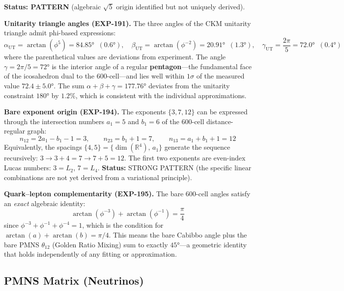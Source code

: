 \documentclass[12pt,a4paper]{article}
\begin{document}
\textbf{Status: PATTERN} (algebraic $\sqrt{5}$ origin identified but not uniquely derived).

\textbf{Unitarity triangle angles (EXP-191).} The three angles of the CKM unitarity triangle admit phi-based expressions:
\begin{equation}
\alpha_{\text{UT}} = \arctan(\phi^5) = 84.85° \;\;(0.6°), \quad
\beta_{\text{UT}} = \arctan(\phi^{-2}) = 20.91° \;\;(1.3°), \quad
\gamma_{\text{UT}} = \frac{2\pi}{5} = 72.0° \;\;(0.4°)
\end{equation}
where the parenthetical values are deviations from experiment. The angle $\gamma = 2\pi/5 = 72°$ is the interior angle of a regular \textbf{pentagon}---the fundamental face of the icosahedron dual to the 600-cell---and lies well within $1\sigma$ of the measured value $72.4 \pm 5.0°$. The sum $\alpha + \beta + \gamma = 177.76°$ deviates from the unitarity constraint $180°$ by $1.2\%$, which is consistent with the individual approximations.

\textbf{Bare exponent origin (EXP-194).} The exponents $\{3, 7, 12\}$ can be expressed through the intersection numbers $a_1 = 5$ and $b_1 = 6$ of the 600-cell distance-regular graph:
\begin{equation}
n_{12} = 2a_1 - b_1 - 1 = 3, \qquad n_{23} = b_1 + 1 = 7, \qquad n_{13} = a_1 + b_1 + 1 = 12
\end{equation}
Equivalently, the spacings $\{4, 5\} = \{\dim(\mathbb{R}^4),\, a_1\}$ generate the sequence recursively: $3 \to 3+4=7 \to 7+5=12$. The first two exponents are even-index Lucas numbers: $3 = L_2$, $7 = L_4$. \textbf{Status:} STRONG PATTERN (the specific linear combinations are not yet derived from a variational principle).

\textbf{Quark--lepton complementarity (EXP-195).} The bare 600-cell angles satisfy an \emph{exact} algebraic identity:
\begin{equation}
\arctan(\phi^{-3}) + \arctan(\phi^{-1}) = \frac{\pi}{4}
\label{eq:qlc}
\end{equation}
since $\phi^{-3} + \phi^{-1} + \phi^{-4} = 1$, which is the condition for $\arctan(a) + \arctan(b) = \pi/4$. This means the bare Cabibbo angle plus the bare PMNS $\theta_{12}$ (Golden Ratio Mixing) sum to exactly $45°$---a geometric identity that holds independently of any fitting or approximation.

\subsection{PMNS Matrix (Neutrinos)}
\end{document}
